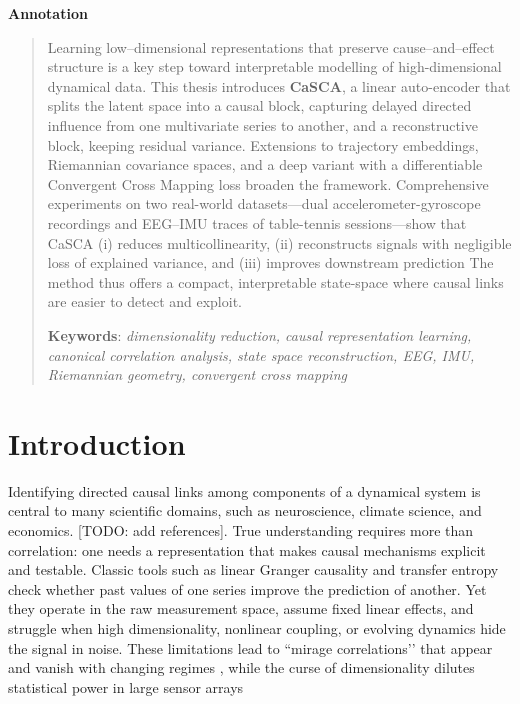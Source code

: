\documentclass[14pt]{extarticle}
\begin{document}
	
	
	\newpage
	\tableofcontents
	\newpage
	
	\begin{center}
		\Large{\textbf{Annotation}}
	\end{center}
	
	\begin{abstract}
		Learning low–dimensional representations that preserve cause–and–effect structure is a key step toward interpretable modelling of high-dimensional dynamical data.
		This thesis introduces \textbf{CaSCA}, a linear auto-encoder that splits the latent space into a causal block, capturing delayed directed influence from one multivariate series to another, and a reconstructive block, keeping residual variance.  
		Extensions to trajectory embeddings, Riemannian covariance spaces, and a deep variant with a differentiable Convergent Cross Mapping loss broaden the framework.  
		Comprehensive experiments on two real-world datasets—dual accelerometer-gyroscope recordings and EEG–IMU traces of table-tennis sessions—show that CaSCA  
		(i) reduces multicollinearity,  
		(ii) reconstructs signals with negligible loss of explained variance, and  
		(iii) improves downstream prediction
		The method thus offers a compact, interpretable state-space where causal links are easier to detect and exploit.
		
		\bigskip
		\textbf{Keywords}: \emph{dimensionality reduction, causal representation learning, canonical correlation analysis, state space reconstruction, EEG, IMU, Riemannian geometry, convergent cross mapping}
	\end{abstract}
	
	\newpage
	
	\section{Introduction}
	
	Identifying directed causal links among components of a dynamical system is central to many scientific domains, such as neuroscience, climate science, and economics. [TODO: add references].
	True understanding requires more than correlation: one needs a representation that makes causal mechanisms explicit and testable.  
	Classic tools such as linear Granger causality \citep{Granger1969} and transfer entropy \citep{Schreiber2000} check whether past values of one series improve the prediction of another.  
	Yet they operate in the raw measurement space, assume fixed linear effects, and struggle when high dimensionality, nonlinear coupling, or evolving dynamics hide the signal in noise.  
	These limitations lead to ``mirage correlations’’ that appear and vanish with changing regimes \citep{Sugihara2012}, while the curse of dimensionality dilutes statistical power in large sensor arrays \citep{Runge2019}
	
\end{document}

